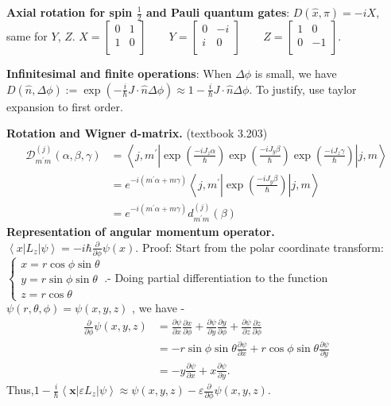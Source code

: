 \textbf{Axial rotation for spin $\frac{1}{2}$ and Pauli quantum gates}: $D(\hat{x} , \pi) = - i X$, same for $Y$, $Z$. $X = 
	\begin{bmatrix}
		0 & 1 \\
		1 & 0 \\
	\end{bmatrix}
	\qquad
	Y = 
	\begin{bmatrix}
		0 & -i \\
		i & 0 \\
	\end{bmatrix}
	\qquad
	Z = 
	\begin{bmatrix}
		1 & 0 \\
		0 & -1 \\
	\end{bmatrix}
.$ 

\textbf{Infinitesimal and finite operations}: When $\Delta \phi$ is small, we have $D(\hat{n} , \Delta \phi) := \exp\left( - \frac{i}{\hbar} J \cdot  \hat{n}  \Delta \phi \right) \approx 1 - \frac{i}{\hbar} J \cdot  \hat{n}  \Delta \phi$. To justify, use taylor expansion to first order.

\textbf{Rotation and Wigner d-matrix.} (textbook 3.203)
\[
\begin{aligned}
\mathscr{D}_{m^{\prime} m}^{(j)}(\alpha, \beta, \gamma) & =\left\langle j, m^{\prime}\left|\exp \left(\frac{-i J_z \alpha}{\hbar}\right) \exp \left(\frac{-i J_y \beta}{\hbar}\right) \exp \left(\frac{-i J_z \gamma}{\hbar}\right)\right| j, m\right\rangle \\
& =e^{-i\left(m^{\prime} \alpha+m \gamma\right)}\left\langle j, m^{\prime}\left|\exp \left(\frac{-i J_y \beta}{\hbar}\right)\right| j, m\right\rangle\\
& =e^{-i\left(m^{\prime} \alpha+m \gamma\right)}d_{m^{\prime} m}^{(j)}(\beta)
\end{aligned}
\]
\textbf{Representation of angular momentum operator.} $\left\langle x\left|L_z\right| \psi\right\rangle=-i \hbar \frac{\partial}{\partial \phi} \psi(x)$.
Proof: 
 Start from the polar coordinate transform: $\begin{cases}
  x = r \cos \phi \sin \theta \\
  y = r \sin \phi \sin \theta \\
  z = r \cos \theta
  \end{cases}
  .$- Doing partial differentiation to the function $\psi(r,\theta, \phi) = \psi(x,y,z)$ , we have
-
  \begin{align*}
  \frac{\partial }{\partial \phi} \psi(x,y,z)
  &= \frac{\partial \psi}{\partial x} \frac{\partial x}{\partial \phi} + \frac{\partial \psi}{\partial y} \frac{\partial y}{\partial \phi}  + \frac{\partial \psi}{\partial z} \frac{\partial z}{\partial \phi} \\
  &= - r \sin \phi \sin \theta \frac{\partial \psi}{\partial x}  + r \cos \phi \sin \theta \frac{\partial \psi}{\partial y} \\
  &= - y \frac{\partial \psi}{\partial x}  + x \frac{\partial \psi}{\partial y}
  .
  \end{align*}
Thus,$1 - \frac{i}{\hbar} \left\langle \mathbf{x} \right| \varepsilon L_z \left| \psi \right\rangle
  \approx \psi(x,y,z) - \varepsilon \frac{\partial }{\partial \phi} \psi(x,y,z)
  .$

